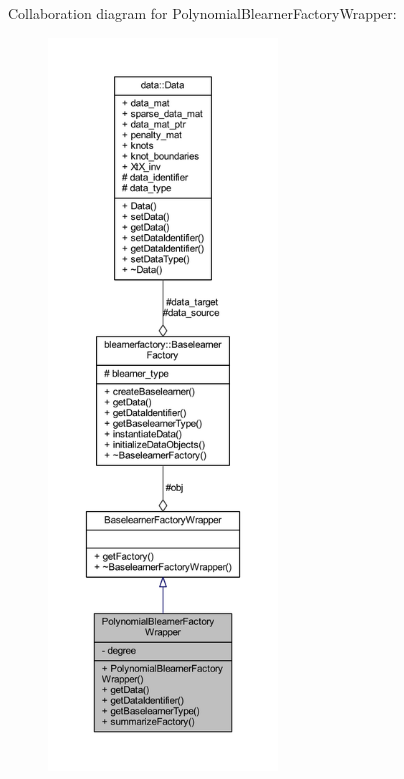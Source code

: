 Collaboration diagram for Polynomial\+Blearner\+Factory\+Wrapper\+:\nopagebreak
\begin{figure}[H]
\begin{center}
\leavevmode
\includegraphics[height=550pt]{class_polynomial_blearner_factory_wrapper__coll__graph}
\end{center}
\end{figure}
